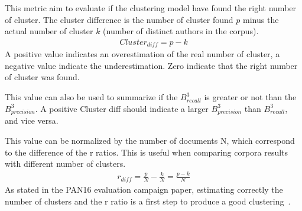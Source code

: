 \begin{definition}
  This metric aim to evaluate if the clustering model have found the right number of cluster.
  The cluster difference is the number of cluster found $p$ minus the actual number of cluster $k$ (number of distinct authors in the corpus).
  \begin{gather*}
    Cluster_{diff} = p - k
  \end{gather*}
  A positive value indicates an overestimation of the real number of cluster, a negative value indicate the underestimation.
  Zero indicate that the right number of cluster was found.

  This value can also be used to summarize if the $B^3_{recall}$ is greater or not than the $B^3_{precision}$.
  A positive Cluster diff should indicate a larger $B^3_{precision}$ than $B^3_{recall}$, and vice versa.

  This value can be normalized by the number of documents N, which correspond to the difference of the r ratios.
  This is useful when comparing corpora results with different number of clusters.
  \begin{gather*}
    r_{diff} = \frac{p}{N} - \frac{k}{N} = \frac{p - k}{N}
  \end{gather*}
  As stated in the PAN16 evaluation campaign paper, estimating correctly the number of clusters and the r ratio is a first step to produce a good clustering~\cite{pan16}.
\end{definition}
